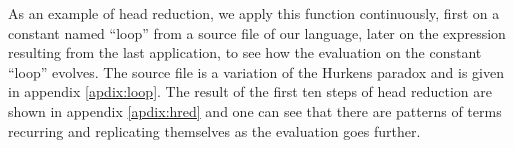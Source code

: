 As an example of head reduction, we apply this function continuously, first on a constant named ``loop'' from a source file of our language, later on the expression resulting from the last application, to see how the evaluation on the constant ``loop'' evolves. The source file is a variation of the Hurkens paradox\cite{hurkens1995simplification} and is given in appendix \ref{apdix:loop}. The result of the first ten steps of head reduction are shown in appendix \ref{apdix:hred} and one can see that there are patterns of terms recurring and replicating themselves as the evaluation goes further.
